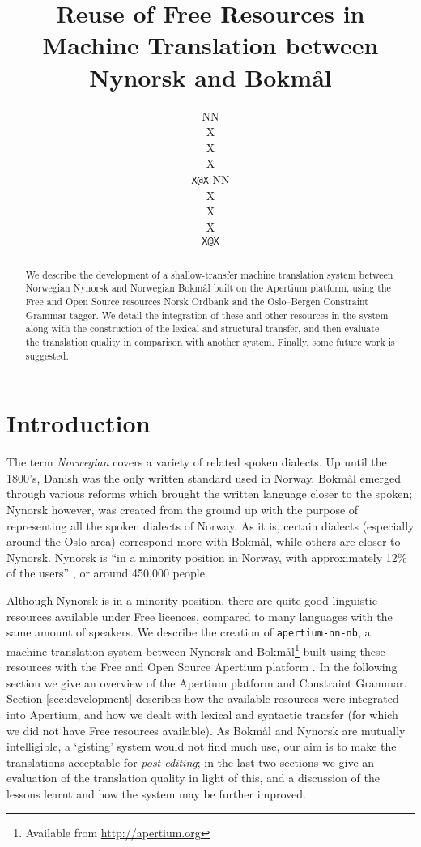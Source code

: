 \documentclass[11pt]{article}
\author{NN\\  X \\ X \\  X \\  {\tt  X@X} \And  NN \\  X \\  X \\  X \\    {\tt X@X}}
\title{Reuse of Free Resources in Machine Translation between Nynorsk and Bokmål}
\begin{document}
\maketitle

  \begin{abstract}
    We describe the development of a shallow-transfer machine
    translation system between Norwegian Nynorsk and Norwegian Bokmål
    built on the Apertium platform, using the Free and Open Source
    resources Norsk Ordbank and the Oslo–Bergen Constraint Grammar
    tagger. We detail the integration of these and other resources in
    the system along with the construction of the lexical and
    structural transfer, and then evaluate the translation quality in
    comparison with another system. Finally, some future work is
    suggested.
  \end{abstract}

\section{Introduction}
The term \emph{Norwegian} covers a variety of related spoken dialects.
Up until the 1800's, Danish was the only written standard used in
Norway. Bokmål emerged through various reforms which brought the
written language closer to the spoken; Nynorsk however, was created
from the ground up with the purpose of representing all the spoken
dialects of Norway. As it is, certain dialects (especially around the
Oslo area) correspond more with Bokmål, while others are closer to
Nynorsk. Nynorsk is ``in a minority position in Norway, with
approximately 12\% of the users'' \citep{everson2000sln}, or around
450,000 people.

Although Nynorsk is in a minority position, there are quite good
linguistic resources available under Free licences, compared to many
languages with the same amount of speakers. We describe the creation
of {\tt apertium-nn-nb}, a machine translation system between Nynorsk
and Bokmål\footnote{Available from
  \href{http://apertium.org}{http://apertium.org} } built using these
resources with the Free and Open Source Apertium platform
\citep{corbi05oss}. In the following section we give an overview of
the Apertium platform and Constraint Grammar. Section
\ref{sec:development} describes how the available resources were
integrated into Apertium, and how we dealt with lexical and syntactic
transfer (for which we did not have Free resources available). As
Bokmål and Nynorsk are mutually intelligible, a `gisting' system would
not find much use, our aim is to make the translations acceptable for
\emph{post-editing}; in the last two sections we give an evaluation of
the translation quality in light of this, and a discussion of the
lessons learnt and how the system may be further improved.
\end{document}
